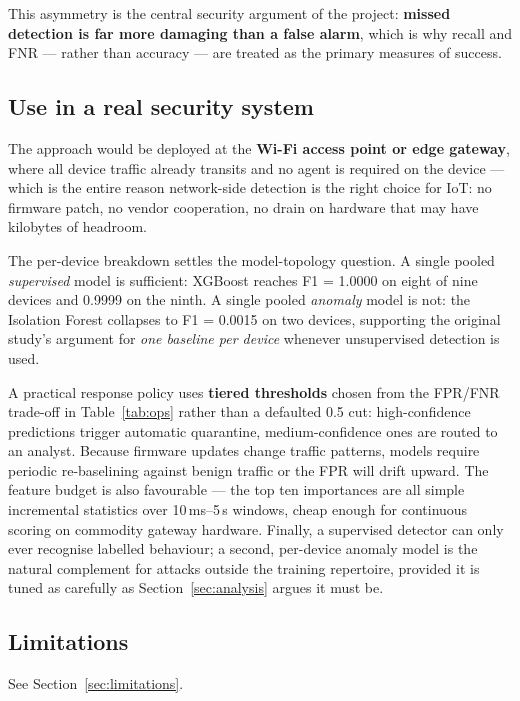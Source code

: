 \documentclass[11pt]{article}
\begin{document}
\medskip
\noindent This asymmetry is the central security argument of the project:
\textbf{missed detection is far more damaging than a false alarm}, which is
why recall and FNR --- rather than accuracy --- are treated as the primary
measures of success.

\subsection{Use in a real security system}
The approach would be deployed at the \textbf{Wi-Fi access point or edge
gateway}, where all device traffic already transits and no agent is required on
the device --- which is the entire reason network-side detection is the right
choice for IoT: no firmware patch, no vendor cooperation, no drain on hardware
that may have kilobytes of headroom.

The per-device breakdown settles the model-topology question. A single pooled
\emph{supervised} model is sufficient: XGBoost reaches F1 = 1.0000 on eight of
nine devices and 0.9999 on the ninth. A single pooled \emph{anomaly} model is
not: the Isolation Forest collapses to F1 = 0.0015 on two devices, supporting
the original study's argument for \emph{one baseline per device} whenever
unsupervised detection is used.

A practical response policy uses \textbf{tiered thresholds} chosen from the
FPR/FNR trade-off in Table~\ref{tab:ops} rather than a defaulted 0.5 cut:
high-confidence predictions trigger automatic quarantine, medium-confidence
ones are routed to an analyst. Because firmware updates change traffic
patterns, models require periodic re-baselining against benign traffic or the
FPR will drift upward. The feature budget is also favourable --- the top ten
importances are all simple incremental statistics over 10\,ms--5\,s windows,
cheap enough for continuous scoring on commodity gateway hardware. Finally, a
supervised detector can only ever recognise labelled behaviour; a second,
per-device anomaly model is the natural complement for attacks outside the
training repertoire, provided it is tuned as carefully as Section~\ref{sec:analysis}
argues it must be.

\subsection{Limitations}
See Section~\ref{sec:limitations}.

\end{document}
